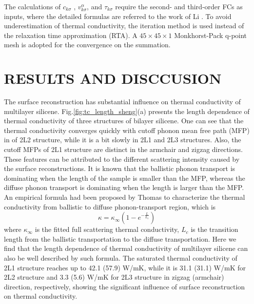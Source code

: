 \documentclass[aps,prb,twocolumn,showpacs,amsmath,amssymb]{revtex4-1}
\begin{document}
The calculations of $c_{k\sigma}$ , $v_{k \sigma}^{\alpha}$, and $\tau_{k\sigma}$ require the second- and third-order FCs as inputs, where the detailed formulas are referred to the work of  Li \cite{Li2014}. To avoid underestimation of thermal conductivity, the iteration method is used instead of the relaxation time approximation (RTA). A $45\times 45 \times 1$ Monkhorst-Pack q-point mesh is adopted for the convergence on the summation.

\section{RESULTS AND DISCCUSION}

The surface reconstruction has substantial influence on thermal conductivity of multilayer silicene.
Fig.\ref{fig:tc_length_sheng}(a) presents the length dependence of thermal conductivity of three structures of bilayer silicene.
One can see that the thermal conductivity converges quickly with cutoff phonon mean free path (MFP) in of 2L2 structure, while it is a bit slowly in 2L1 and 2L3 structures. Also, the cutoff MFPs of 2L1 structure are distinct in the armchair and zigzag directions. These features can be attributed to the different scattering intensity caused by the surface reconstructions.
It is known that the ballistic phonon transport is dominating when the length of the sample is smaller than the MFP,  whereas the diffuse phonon transport is  dominating when the length is larger than the MFP.
An empirical formula had been proposed by Thomas\cite{Thomas2010}  to characterize the thermal conductivity from ballistic to diffuse phonon-transport region, which is
\begin{equation}
  \kappa = \kappa_\infty (1-e^{-\frac{L}{L_c}}) \label{eq:eq_nemd}
\end{equation}
where $\kappa_\infty$ is the fitted full scattering thermal conductivity, $L_c$ is the transition length from the ballistic transportation to the diffuse transportation. Here we find that the length dependence of thermal conductivity of multilayer silicene can also be well described by such formula.
The saturated thermal conductivity of 2L1 structure reaches up to 42.1 (57.9) W/mK, while it is  31.1 (31.1) W/mK  for 2L2 structure and  3.3 (5.6)  W/mK for 2L3 structure in zigzag (armchair) direction, respectively,  showing the significant influence of surface reconstruction on thermal conductivity.
\end{document}

